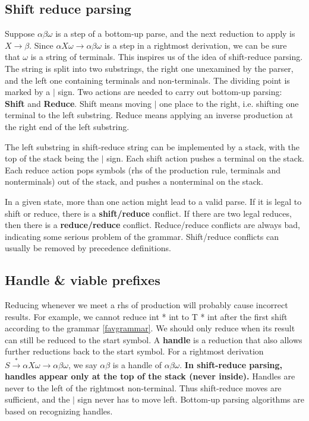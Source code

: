 \subsection{Shift reduce parsing}
Suppose $\alpha\beta\omega$ is a step of a bottom-up parse, and the next reduction to apply is $X\rightarrow\beta$. Since $\alpha X\omega\rightarrow\alpha\beta\omega$ is a step in a rightmost derivation, we can be sure that $\omega$ is a string of terminals. This inspires us of the idea of shift-reduce parsing. The string is split into two substrings, the right one unexamined by the parser, and the left one containing terminals and non-terminals. The dividing point is marked by a $|$ sign. Two actions are needed to carry out bottom-up parsing: \textbf{Shift} and \textbf{Reduce}. Shift means moving $|$ one place to the right, i.e. shifting one terminal to the left substring. Reduce means applying an inverse production at the right end of the left substring.

The left substring in shift-reduce string can be implemented by a stack, with the top of the stack being the $|$ sign. Each shift action pushes a terminal on the stack. Each reduce action pops symbols (rhs of the production rule, terminals and nonterminals) out of the  stack, and pushes a nonterminal on the stack. 

In a given state, more than one action might lead to a valid parse. If it is legal to shift or reduce, there is a \textbf{shift/reduce} conflict. If there are two legal reduces, then there is a \textbf{reduce/reduce} conflict. Reduce/reduce conflicts are always bad, indicating some serious problem of the grammar. Shift/reduce conflicts can usually be removed by precedence definitions.
\subsection{Handle \& viable prefixes}
Reducing whenever we meet a rhs of production will probably cause incorrect results. For example, we cannot reduce int * int to T * int after the first shift according to the grammar \eqref{favgrammar}. We should only reduce when its result can still be reduced to the start symbol. A \textbf{handle} is a reduction that also allows further reductions back to the start symbol. For a rightmost derivation $S\xrightarrow{*}\alpha X\omega\rightarrow\alpha\beta\omega$, we say $\alpha\beta$ is a handle of $\alpha\beta\omega$. \textbf{In shift-reduce parsing, handles appear only at the top of the stack (never inside).} Handles are never to the left of the rightmost non-terminal. Thus shift-reduce moves are sufficient, and the $|$ sign never has to move left. Bottom-up parsing algorithms are based on recognizing handles.

